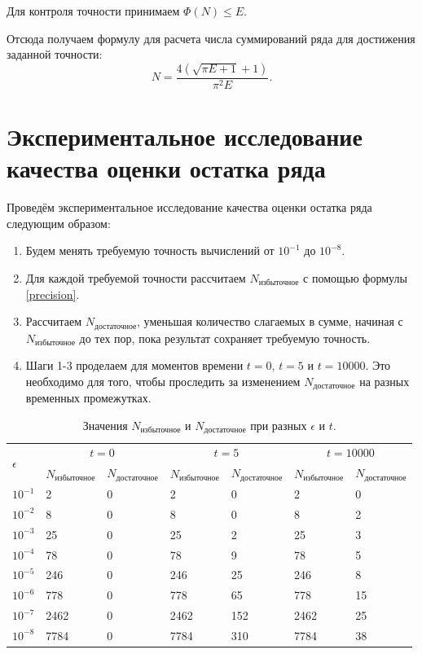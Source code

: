 {{Для контроля точности принимаем $\Phi(N) \le E$.

Отсюда получаем формулу для расчета числа суммирований ряда для достижения заданной точности:
\begin{equation}\label{precision}
	N = \dfrac{4(\sqrt{\pi E + 1}+1)}{\pi^2 E}.
\end{equation}
}

\newpage
\section{Экспериментальное исследование качества оценки остатка ряда }
{
Проведём экспериментальное исследование качества оценки остатка ряда следующим образом:
\begin{enumerate}
\item {
	Будем менять требуемую точность вычислений от $10^{-1}$ до $10^{-8}$.
}
\item {
	Для каждой требуемой точности рассчитаем $N_\text{избыточное}$ с помощью формулы \eqref{precision}.
}
\item {
	Рассчитаем $N_\text{достаточное}$, уменьшая количество слагаемых в сумме, начиная с $N_\text{избыточное}$ до тех пор, пока результат сохраняет требуемую точность.
}
\item {
	Шаги 1-3 проделаем для моментов времени $t = 0$, $t = 5$ и $t = 10000$. Это необходимо для того, чтобы проследить за изменением $N_\text{достаточное}$ на разных временных промежутках.
}
\end{enumerate}

\begin{table}[H]
\centering
\caption{Значения $N_\text{избыточное}$ и $N_\text{достаточное}$ при разных $\epsilon$ и $t$.}
\begin{tabularx}{\textwidth}{|Y|Y|Y|Y|Y|Y|Y|}
\hline
{} &  &  &  \\ 
 & $N_\text{избыточное}$ & $N_\text{достаточное}$  & $N_\text{избыточное}$ & $N_\text{достаточное}$  & $N_\text{избыточное}$ & $N_\text{достаточное}$  \\ \hline
$10^{-1}$ & 2 & 0 & 2 & 0 & 2 & 0 \\ \hline
$10^{-2}$ & 8 & 0 & 8 & 0 & 8 & 2 \\ \hline
$10^{-3}$ & 25 & 0 & 25 & 2 & 25 & 3 \\ \hline
$10^{-4}$ & 78 & 0 & 78 & 9 & 78 & 5 \\ \hline
$10^{-5}$ & 246 & 0 & 246 & 25 & 246 & 8 \\ \hline
$10^{-6}$ & 778 & 0 & 778 & 65 & 778 & 15 \\ \hline
$10^{-7}$ & 2462 & 0 & 2462 & 152 & 2462 & 25 \\ \hline
$10^{-8}$ & 7784 & 0 & 7784 & 310 & 7784 & 38 \\ \hline
\end{tabularx}
\label{table_accuracy}
\end{table}

}}
